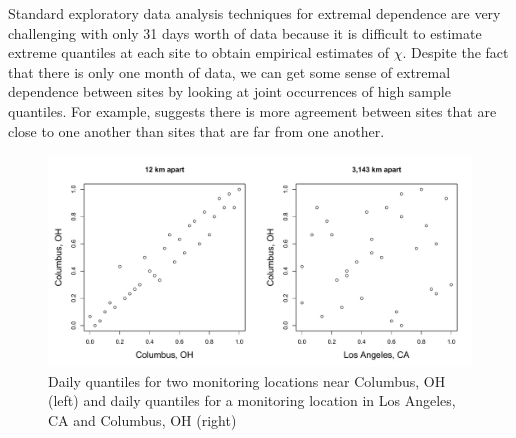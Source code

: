 Standard exploratory data analysis techniques for extremal dependence are very challenging with only 31 days worth of data because it is difficult to estimate extreme quantiles at each site to obtain empirical estimates of $\chi$.
Despite the fact that there is only one month of data, we can get some sense of extremal dependence between sites by looking at joint occurrences of high sample quantiles.
For example,  suggests there is more agreement between sites that are close to one another than sites that are far from one another.
\begin{figure}
  \centering
  \includegraphics[width=\linewidth]{plots/daily-quantiles-ozone.pdf}
  \caption{Daily quantiles for two monitoring locations near Columbus, OH (left) and daily quantiles for a monitoring location in Los Angeles, CA and Columbus, OH (right)}
  \label{stfig:bivariateozone}
\end{figure}


